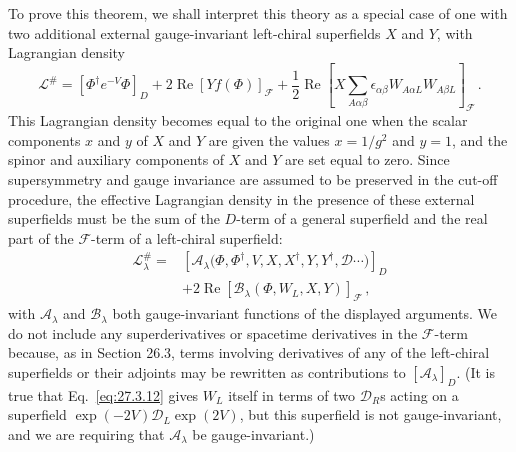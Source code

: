 To prove this theorem, we shall interpret this theory as a special case of
one with two additional external gauge-invariant left-chiral superfields
\(X\) and \(Y\), with Lagrangian density
\begin{equation}
  \mathcal{L}^{\#}
  =
  \left[\Phi^\dagger e^{-V}\Phi\right]_D
  +2\operatorname{Re}\left[Yf(\Phi)\right]_{\mathcal{F}}
  +\frac12\operatorname{Re}
  \left[
    X\sum_{A\alpha\beta}
    \epsilon_{\alpha\beta}W_{A\alpha L}W_{A\beta L}
  \right]_{\mathcal{F}}\,.
  \tag{27.6.4}\label{eq:27.6.4}
\end{equation}
This Lagrangian density becomes equal to the original one when the scalar
components \(x\) and \(y\) of \(X\) and \(Y\) are given the values
\(x=1/g^2\) and \(y=1\), and the spinor and auxiliary components of \(X\)
and \(Y\) are set equal to zero. Since supersymmetry and gauge invariance are
assumed to be preserved in the cut-off procedure, the effective Lagrangian
density in the presence of these external superfields must be the sum of the
\(D\)-term of a general superfield and the real part of the
\(\mathcal{F}\)-term of a left-chiral superfield:
\begin{equation}
  \begin{aligned}
  \mathcal{L}^{\#}_\lambda
  ={}&
  \left[
    \mathcal{A}_\lambda
    \bigl(\Phi,\Phi^\dagger,V,X,X^\dagger,Y,Y^\dagger,
    \mathcal{D}\cdots\bigr)
  \right]_D
  \\
  &+2\operatorname{Re}
  \left[
    \mathcal{B}_\lambda(\Phi,W_L,X,Y)
  \right]_{\mathcal{F}}\,,
  \end{aligned}
  \tag{27.6.5}\label{eq:27.6.5}
\end{equation}
with \(\mathcal{A}_\lambda\) and \(\mathcal{B}_\lambda\) both
gauge-invariant functions of the displayed arguments. We do not include any
superderivatives or spacetime derivatives in the \(\mathcal{F}\)-term
because, as in Section 26.3, terms involving derivatives of any of the
left-chiral superfields or their adjoints may be rewritten as contributions
to \([\mathcal{A}_\lambda]_D\). (It is true that Eq.~\eqref{eq:27.3.12}
gives \(W_L\) itself in terms of two \(\mathcal{D}_R\)s acting on a
superfield \(\exp(-2V)\mathcal{D}_L\exp(2V)\), but this superfield is not
gauge-invariant, and we are requiring that \(\mathcal{A}_\lambda\) be
gauge-invariant.)

